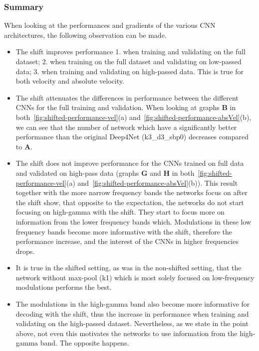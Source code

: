 \subsubsection{Summary}\label{subsubsec:centre-shiftig-summary}
When looking at the performances and gradients of the various CNN architectures, the following observation can be made.
\begin{itemize}
    \item The shift improves performance 1. when training and validating on the full dataset; 2. when training on the full dataset and validating on low-passed data;
    3. when training and validating on high-passed data. This is true for both velocity and absolute velocity.
    \item The shift attenuates the differences in performance between the different CNNs for the full training and validation.
    When looking at graphs \textbf{B} in both~\cref{fig:shifted-performance-vel}(a) and~\cref{fig:shifted-performance-absVel}(b), we can see that the number of network which have a significantly better performance than the original Deep4Net (k3\_d3\_sbp0) decreases compared to \textbf{A}.
    \item The shift does not improve performance for the CNNs trained on full data and validated on high-pass data (graphs \textbf{G} and \textbf{H} in both~\ref{fig:shifted-performance-vel}(a) and~\ref{fig:shifted-performance-absVel}(b)).
    This result together with the more narrow frequency bands the networks focus on after the shift show, that opposite to the expectation, the networks do not start focusing on high-gamma with the shift.
    They start to focus more on information from the lower frequency bands which.
    Modulations in these low frequency bands become more informative with the shift, therefore the performance increase, and the interest of the CNNs in higher frequencies drops.
    \item It is true in the shifted setting, as was in the non-shifted setting, that the network without max-pool (k1) which is most solely focused on low-frequency modulations performs the best.
    \item The modulations in the high-gamma band also become more informative for decoding with the shift, thus the increase in performance when training and validating on the high-passed dataset.
    Nevertheless, as we state in the point above, not even this motivates the networks to use information from the high-gamma band.
    The opposite happens.
\end{itemize}

